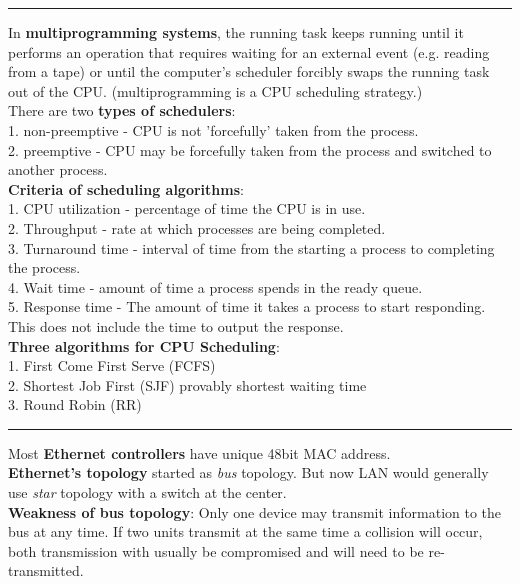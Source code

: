 \documentclass[8pt,a4paper,landscape]{article}
\begin{document}
\begin{spacing}{-1}
\begin{multicols*}{3}
\hrule \noindent
In \textbf{multiprogramming systems}, the running task keeps running until it performs an operation that requires waiting for an external event (e.g. reading from a tape) or until the computer's scheduler forcibly swaps the running task out of the CPU. (multiprogramming is a CPU scheduling strategy.) \\
There are two \textbf{types of schedulers}: \\
1. non-preemptive - CPU is not 'forcefully' taken from the process. \\
2. preemptive - CPU may be forcefully taken from the process and switched to another process. \\
\textbf{Criteria of scheduling algorithms}: \\
1. CPU utilization - percentage of time the CPU is in use. \\
2. Throughput - rate at which processes are being completed. \\
3. Turnaround time - interval of time from the starting a process to completing the process. \\
4. Wait time - amount of time a process spends in the ready queue. \\
5. Response time - The amount of time it takes a process to start responding. This does not include the time to output the
response. \\
\textbf{Three algorithms for CPU Scheduling}: \\ 
1. First Come First Serve (FCFS) \\
2. Shortest Job First (SJF) provably shortest waiting time \\
3. Round Robin (RR) \\

\hrule \noindent
Most \textbf{Ethernet controllers} have unique 48bit MAC address. \\
\textbf{Ethernet's topology} started as \textit{bus} topology. But now LAN would generally use \textit{star} topology with a switch at the center. \\
\textbf{Weakness of bus topology}: Only one device may transmit information to the bus at any time. If two units transmit at the same time a collision will occur, both transmission with usually be compromised and will need to be re-transmitted.


\end{multicols*}
\end{spacing}
\end{document}
